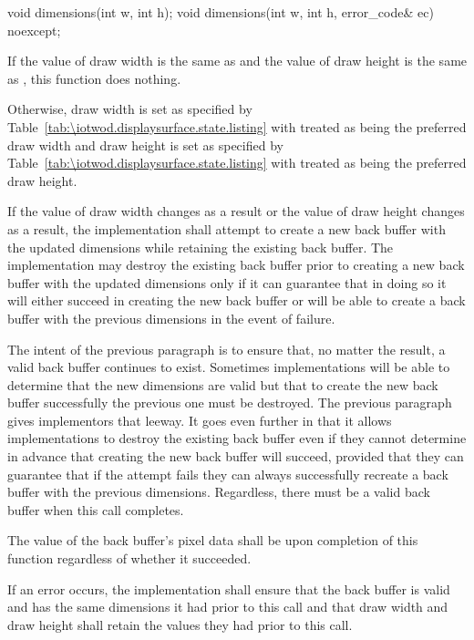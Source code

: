 \begin{itemdecl}
void dimensions(int w, int h);
void dimensions(int w, int h, error_code& ec) noexcept;
\end{itemdecl}
\begin{itemdescr}
\pnum
\effects
If the value of draw width is the same as  and the value of draw height is the same as , this function does nothing.

\pnum
Otherwise, draw width is set as specified by Table~\ref{tab:\iotwod.displaysurface.state.listing} with  treated as being the preferred draw width and draw height is set as specified by Table~\ref{tab:\iotwod.displaysurface.state.listing} with  treated as being the preferred draw height.

\pnum
If the value of draw width changes as a result or the value of draw height changes as a result, the implementation shall attempt to create a new back buffer with the updated dimensions while retaining the existing back buffer. The implementation may destroy the existing back buffer prior to creating a new back buffer with the updated dimensions only if it can guarantee that in doing so it will either succeed in creating the new back buffer or will be able to create a back buffer with the previous dimensions in the event of failure.

\pnum
\begin{note}
The intent of the previous paragraph is to ensure that, no matter the result, a valid back buffer continues to exist. Sometimes implementations will be able to determine that the new dimensions are valid but that to create the new back buffer successfully the previous one must be destroyed. The previous paragraph gives implementors that leeway. It goes even further in that it allows implementations to destroy the existing back buffer even if they cannot determine in advance that creating the new back buffer will succeed, provided that they can guarantee that if the attempt fails they can always successfully recreate a back buffer with the previous dimensions. Regardless, there must be a valid back buffer when this call completes.
\end{note}

\pnum
The value of the back buffer's pixel data shall be \unspecnorm upon completion of this function regardless of whether it succeeded.

\pnum
If an error occurs, the implementation shall ensure that the back buffer is valid and has the same dimensions it had prior to this call and that draw width and draw height shall retain the values they had prior to this call.


\end{itemdescr}
